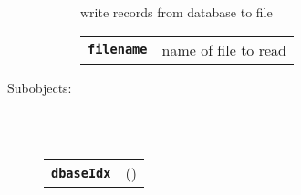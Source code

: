 \begin{description}
\begin{description}
        write records from database to file

      \begin{tabular}{ll}
 \texttt{\textbf{filename}} &  name of file to read  \\
      \end{tabular}
    \end{description}

  \item[Subobjects:] \hfill \\
\ 
    \begin{tabular}{ll}
      \texttt{\textbf{dbaseIdx}} & (\Jref{module}{DBaseIdx}) \\
    \end{tabular}
\vspace{3mm}

\end{description}

